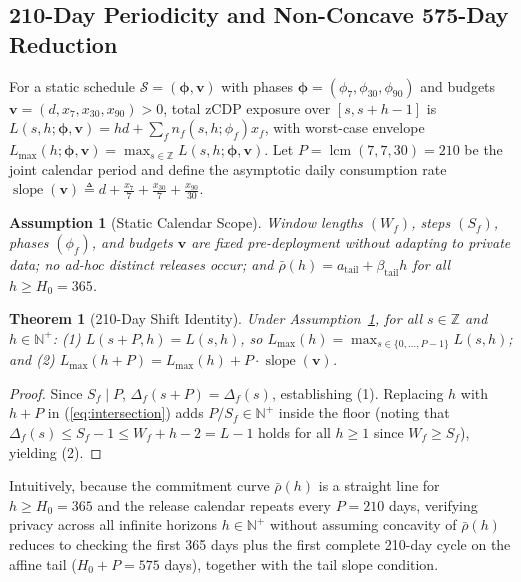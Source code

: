 \documentclass[sigconf, nonacm]{acmart}
\newtheorem{assumption}{Assumption}
\newtheorem{theorem}{Theorem}
\begin{document}
\subsection{210-Day Periodicity and Non-Concave 575-Day Reduction}
For a static schedule $\mathcal{S} = (\boldsymbol{\phi}, \mathbf{v})$ with phases $\boldsymbol{\phi} = (\phi_7, \phi_{30}, \phi_{90})$ and budgets $\mathbf{v} = (d, x_7, x_{30}, x_{90}) > 0$, total zCDP exposure over $[s, s+h-1]$ is $L(s, h; \boldsymbol{\phi}, \mathbf{v}) = h d + \sum_f n_f(s, h; \phi_f) x_f$, with worst-case envelope $L_{\max}(h; \boldsymbol{\phi}, \mathbf{v}) = \max_{s \in \mathbb{Z}} L(s, h; \boldsymbol{\phi}, \mathbf{v})$. Let $P = \operatorname{lcm}(7, 7, 30) = 210$ be the joint calendar period and define the asymptotic daily consumption rate $\operatorname{slope}(\mathbf{v}) \triangleq d + \frac{x_7}{7} + \frac{x_{30}}{7} + \frac{x_{90}}{30}$.

\begin{assumption}[Static Calendar Scope]
\label{assump:static}
Window lengths $(W_f)$, steps $(S_f)$, phases $(\phi_f)$, and budgets $\mathbf{v}$ are fixed pre-deployment without adapting to private data; no ad-hoc distinct releases occur; and $\bar{\rho}(h) = a_{\mathrm{tail}} + \beta_{\mathrm{tail}} h$ for all $h \ge H_0 = 365$.
\end{assumption}

\begin{theorem}[210-Day Shift Identity]
\label{thm:periodicity}
Under Assumption~\ref{assump:static}, for all $s \in \mathbb{Z}$ and $h \in \mathbb{N}^+$: (1) $L(s+P, h) = L(s, h)$, so $L_{\max}(h) = \max_{s \in \{0,\dots,P-1\}} L(s,h)$; and (2) $L_{\max}(h+P) = L_{\max}(h) + P \cdot \operatorname{slope}(\mathbf{v})$.
\end{theorem}
\begin{proof}
Since $S_f \mid P$, $\Delta_f(s+P) = \Delta_f(s)$, establishing (1). Replacing $h$ with $h+P$ in (\ref{eq:intersection}) adds $P/S_f \in \mathbb{N}^+$ inside the floor (noting that $\Delta_f(s) \le S_f - 1 \le W_f + h - 2 = L - 1$ holds for all $h \ge 1$ since $W_f \ge S_f$), yielding (2).
\end{proof}

Intuitively, because the commitment curve $\bar{\rho}(h)$ is a straight line for $h \ge H_0 = 365$ and the release calendar repeats every $P = 210$ days, verifying privacy across all infinite horizons $h \in \mathbb{N}^+$ without assuming concavity of $\bar{\rho}(h)$ reduces to checking the first 365 days plus the first complete 210-day cycle on the affine tail ($H_0 + P = 575$ days), together with the tail slope condition.
\end{document}
